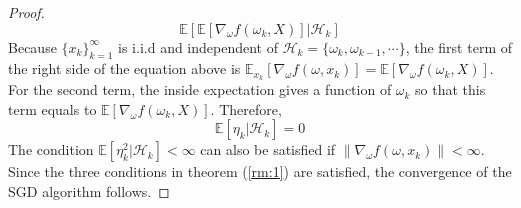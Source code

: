 \begin{proof}
\begin{equation*}
      \mathbb{E}[\mathbb{E}[\nabla_{\omega}f(\omega_{k},X)]|\mathcal{H}_{k}]
    \end{equation*}
    Because $\{x_{k}\}_{k=1}^{\infty}$ is i.i.d and independent of $\mathcal{H}_{k}=\{\omega_{k},\omega_{k-1},\cdots\}$,
    the first term of the right side of the equation above is
    $\mathbb{E}_{x_{k}}[\nabla_{\omega}f(\omega,x_{k})]=\mathbb{E}[\nabla_{\omega}f(\omega_{k},X)]$. For the second term,
    the inside expectation gives a function of $\omega_{k}$ so that this term equals to  $\mathbb{E}[\nabla_{\omega}f(\omega_{k},X)]$. Therefore,
    \begin{equation*}
      \mathbb{E}[\eta_{k}|\mathcal{H}_{k}] = 0
    \end{equation*}
    The condition $\mathbb{E}[\eta_{k}^{2}|\mathcal{H}_{k}]<\infty$ can also be satisfied if
    $\|\nabla_{\omega}f(\omega,x_{k})\|<\infty$. Since the three conditions in theorem (\ref{rm:1}) are satisfied, the
    convergence of the SGD algorithm follows.
  \end{proof}
